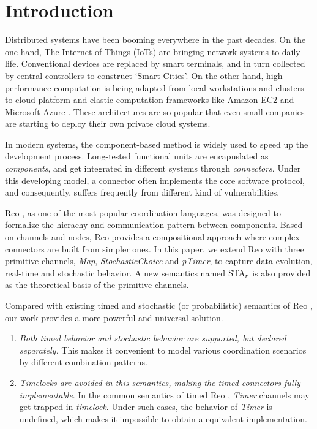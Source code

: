 \section{Introduction}
\label{sec:intro}

Distributed systems have been booming everywhere in the past decades. On the one hand, The Internet of Things (IoTs) are bringing network systems to daily life. Conventional devices are replaced by smart terminals, and in turn collected by central controllers to construct `Smart Cities'. On the other hand, high-performance computation is being adapted from local workstations and clusters to cloud platform and elastic computation frameworks like Amazon EC2 \cite{Newcombe2015} and Microsoft Azure \cite{Li2009}. These architectures are so popular that even small companies are starting to deploy their own private cloud systems. 

In modern systems, the component-based method is widely used to speed up the development process. Long-tested functional units are encapuslated as \emph{components}, and get integrated in different systems through \emph{connectors}. Under this developing model, a connector often implements the core software protocol, and consequently, suffers frequently from different kind of vulnerabilities.

Reo \cite{ARBAB2004}, as one of the most popular coordination languages, was designed to formalize the hierachy and communication pattern between components. Based on channels and nodes, Reo provides a compositional approach where complex connectors are built from simpler ones.
In this paper, we extend Reo with three primitive channels, \emph{Map}, \emph{StochasticChoice} and \emph{pTimer}, to capture data evolution, real-time and stochastic behavior. A new semantics named $\mbox{STA}_r$ is also provided as the theoretical basis of the primitive channels.

Compared with existing timed and stochastic (or probabilistic) semantics of Reo \cite{Arbab2009,Baier2006,Meng2012,Meng2007}, our work provides a more powerful and universal solution. 
\begin{enumerate}
    \item \emph{Both timed behavior and stochastic behavior are supported, but declared separately.} This makes it convenient to model various coordination scenarios by different combination patterns.
    \item \emph{Timelocks are avoided in this semantics, making the timed connectors fully implementable}. In the common semantics of timed Reo \cite{Arbab2006,Meng2012}, \emph{Timer} channels may get trapped in \emph{timelock}. Under such cases, the behavior of \emph{Timer} is undefined, which makes it impossible to obtain a equivalent implementation.
\end{enumerate}

